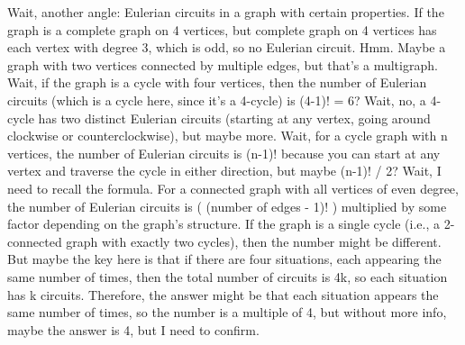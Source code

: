 Wait, another angle: Eulerian circuits in a graph with certain properties. If the graph is a complete graph on 4 vertices, but complete graph on 4 vertices has each vertex with degree 3, which is odd, so no Eulerian circuit. Hmm. Maybe a graph with two vertices connected by multiple edges, but that's a multigraph. Wait, if the graph is a cycle with four vertices, then the number of Eulerian circuits (which is a cycle here, since it's a 4-cycle) is (4-1)! = 6? Wait, no, a 4-cycle has two distinct Eulerian circuits (starting at any vertex, going around clockwise or counterclockwise), but maybe more. Wait, for a cycle graph with n vertices, the number of Eulerian circuits is (n-1)! because you can start at any vertex and traverse the cycle in either direction, but maybe (n-1)! / 2? Wait, I need to recall the formula. For a connected graph with all vertices of even degree, the number of Eulerian circuits is ( (number of edges - 1)! ) multiplied by some factor depending on the graph's structure. If the graph is a single cycle (i.e., a 2-connected graph with exactly two cycles), then the number might be different. But maybe the key here is that if there are four situations, each appearing the same number of times, then the total number of circuits is 4k, so each situation has k circuits. Therefore, the answer might be that each situation appears the same number of times, so the number is a multiple of 4, but without more info, maybe the answer is 4, but I need to confirm.

